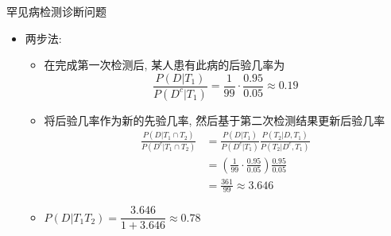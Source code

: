 \begin{frame}{罕见病检测诊断问题}
			\begin{itemize}[<+-|alert@+>]
			\item 两步法:
			\begin{itemize}[<+-|alert@+>]
			\item 在完成第一次检测后, 某人患有此病的后验几率为
             $$\frac{P(D|T_1)}{P(D^c|T_1)}=\frac{1}{99}\cdot\frac{0.95}{0.05}\approx 0.19$$
			 \item 将后验几率作为新的先验几率, 然后基于第二次检测结果更新后验几率%
			 \begin{align*}
				\frac{P(D|T_1\cap T_2)}{P(D^c|T_1\cap T_2)}
				&=\frac{P(D|T_1)}{P(D^c|T_1)}\frac{P(T_2|D,T_1)}{P(T_2|D^c,T_1)}\\
				&=(\frac{1}{99}\cdot\frac{0.95}{0.05})\frac{0.95}{0.05}\\
				&=\frac{361}{99}\approx 3.646
			 \end{align*}

			\item $P(D|T_{1}T_{2})=\dfrac{3.646}{1+3.646}\approx 0.78$
			\end{itemize}

		\end{itemize}
\end{frame}







